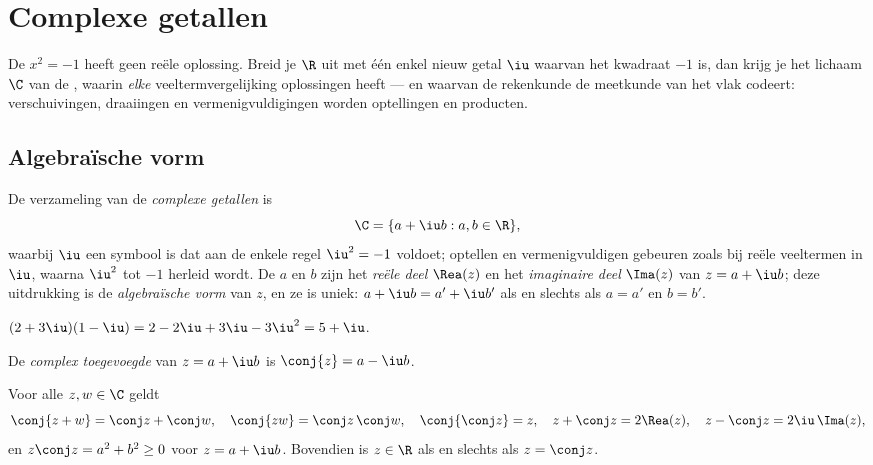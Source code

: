 \chapter{Complexe getallen}\label{ch:g12:complex}

De  $x^2 = -1$ heeft geen reële oplossing. Breid je $\R$ uit met
één enkel nieuw getal $\iu$ waarvan het kwadraat $-1$ is, dan krijg je het
lichaam $\C$ van de , waarin \emph{elke} veeltermvergelijking
oplossingen heeft --- en waarvan de rekenkunde de meetkunde van het vlak
codeert: verschuivingen, draaiingen en vermenigvuldigingen worden optellingen
en producten.

\section{Algebraïsche vorm}

\begin{definition}\label{def:g12:complex:def}
De verzameling van de \emph{complexe getallen} is
\[
\C = \{a + \iu b : a, b \in \R\},
\]
waarbij $\iu$ een symbool is dat aan de enkele regel $\iu^2 = -1$ voldoet;
optellen en vermenigvuldigen gebeuren zoals bij reële veeltermen in $\iu$,
waarna $\iu^2$ tot $-1$ herleid wordt. De  $a$ en $b$ zijn het
\emph{reële deel} $\Rea(z)$ en het \emph{imaginaire
deel} $\Ima(z)$ van $z = a + \iu b$; deze uitdrukking
is de \emph{algebraïsche vorm} van $z$, en ze is
uniek: $a + \iu b = a' + \iu b'$ als en slechts als $a = a'$ en $b = b'$.
\end{definition}

\begin{example}
$(2 + 3\iu)(1 - \iu) = 2 - 2\iu + 3\iu - 3\iu^2 = 5 + \iu$.
\end{example}

\begin{definition}\label{def:g12:complex:conjugate}
De \emph{complex toegevoegde} van $z = a + \iu b$
is $\conj{z} = a - \iu b$.
\end{definition}

\begin{proposition}\label{prop:g12:complex:conjugate}
Voor alle $z, w \in \C$ geldt
\[
\conj{z + w} = \conj z + \conj w, \quad
\conj{zw} = \conj z\,\conj w, \quad
\conj{\conj z} = z, \quad
z + \conj z = 2\Rea(z), \quad
z - \conj z = 2\iu\,\Ima(z),
\]
en $z\conj z = a^2 + b^2 \geq 0$ voor $z = a + \iu b$. Bovendien is
$z \in \R$ als en slechts als $z = \conj z$.
\end{proposition}

